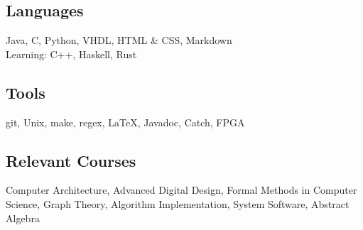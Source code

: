 \documentclass[18pt]{article}
\begin{document}
  \subsection*{Languages}\label{languages}
  Java,
  C,
  Python,
  VHDL,
  HTML \& CSS,
  Markdown\\
  Learning: C++, Haskell, Rust
  
  \subsection*{Tools}\label{tools}
  git,
  Unix,
  make,
  regex,
  \LaTeX,
  Javadoc,
  Catch,
  FPGA
  
  \subsection*{Relevant Courses}\label{relevant-courses}
      Computer Architecture,
      Advanced Digital Design,
      Formal Methods in Computer Science,
      Graph Theory,
      Algorithm Implementation,
      System Software,
      Abstract Algebra
    
\end{document}

